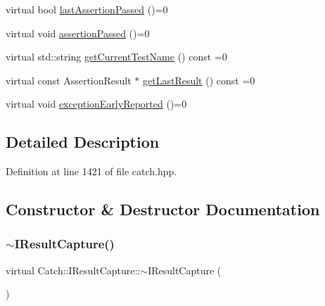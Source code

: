 \begin{DoxyCompactItemize}
\item 
virtual bool \mbox{\hyperlink{struct_catch_1_1_i_result_capture_a973435fbdcb2f6f07a0ec5719a01e956}{last\+Assertion\+Passed}} ()=0
\item 
virtual void \mbox{\hyperlink{struct_catch_1_1_i_result_capture_a9b0ef2cb071e9a9dc6ec1b533026aea7}{assertion\+Passed}} ()=0
\item 
virtual std\+::string \mbox{\hyperlink{struct_catch_1_1_i_result_capture_aea1617f4a84cc648246aa3ed6918b5bf}{get\+Current\+Test\+Name}} () const =0
\item 
virtual const Assertion\+Result $\ast$ \mbox{\hyperlink{struct_catch_1_1_i_result_capture_ab18872c89fab97405a56e9c6a4919736}{get\+Last\+Result}} () const =0
\item 
virtual void \mbox{\hyperlink{struct_catch_1_1_i_result_capture_ae63ecec95db4c236c63ecf616f483810}{exception\+Early\+Reported}} ()=0
\end{DoxyCompactItemize}


\subsection{Detailed Description}


Definition at line 1421 of file catch.\+hpp.



\subsection{Constructor \& Destructor Documentation}
\mbox{\label{struct_catch_1_1_i_result_capture_a3bd16719d6772b7470887fc36c6d0808}} 
\subsubsection{\texorpdfstring{$\sim$\+I\+Result\+Capture()}{~IResultCapture()}}
{\footnotesize\ttfamily virtual Catch\+::\+I\+Result\+Capture\+::$\sim$\+I\+Result\+Capture (\begin{DoxyParamCaption}{ }\end{DoxyParamCaption})\hspace{0.3cm}{\ttfamily [virtual]}}



